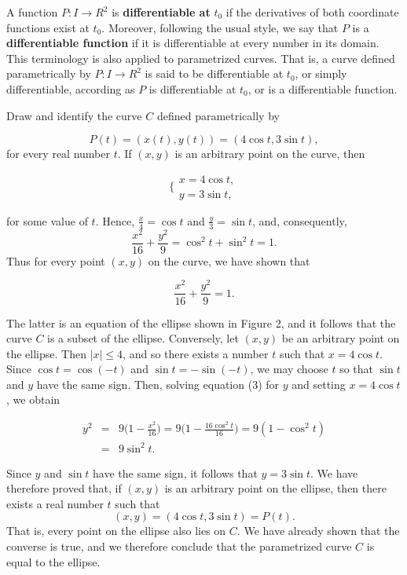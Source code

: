 A function $P : I \rightarrow R^2$ is \textbf{differentiable at} $t_0$ if the derivatives of both coordinate functions exist at $t_0$. Moreover, following the usual style, we say that $P$ is a \textbf{differentiable function} if it is differentiable at every number in its domain. This terminology is also applied to parametrized curves. That is, a curve defined parametrically by $P : I \rightarrow R^2$ is said to be differentiable at $t_0$, or simply differentiable, according as $P$ is differentiable at $t_0$, or is a differentiable function.
\begin{example} Draw and identify the curve $C$ defined parametrically by

$$
P(t) = (x(t), y(t)) = (4\cos t, 3\sin t), 
$$
\noindent for every real number $t$. If $(x, y)$ is an arbitrary point on the curve, then 
 
$$
 \{ \begin{array}{l}
x = 4 \cos t, \\
y = 3 \sin t,
\end{array}
$$

\noindent for some value of $t$. Hence, $\frac{x}{4} = \cos t$ and $\frac{y}{3} = \sin t$, and, consequently, 
$$
\frac{x^2}{16} + \frac{y^2}{9} = \cos^2 t + \sin^2 t = 1 .
$$
\noindent Thus for every point $(x, y)$ on the curve, we have shown that 

\begin{equation}
\frac{x^2}{16} + \frac{y^2}{9} = 1.  
\label{eq10.1.3}
\end{equation}


\noindent The latter is an equation of the ellipse shown in Figure 2, and it follows that the curve $C$ is a subset of the ellipse. Conversely, let $(x, y)$ be an arbitrary point on the ellipse. Then $|x| \leq 4$, and so there exists a number $t$ such that
$x = 4 \cos t$. Since $\cos t = \cos(-t)$ and $\sin t = -\sin(-t)$, we may choose $t$ so that $\sin t$ and $y$ have the same sign. Then, solving equation (3) for $y$ and setting $x = 4 \cos t$, we obtain



\begin{eqnarray*}
y^2 &=& 9 \Big(1 - \frac{x^2}{16} \Big) = 9 \Big(1 - \frac{16 \cos^2 t}{16} \Big) = 9(1 - \cos^2 t) \\
      &=& 9 \sin^2t.
\end{eqnarray*}

\noindent Since $y$ and $\sin t$ have the same sign, it follows that $y = 3 \sin t$. We have therefore proved that, if $(x, y)$ is an arbitrary point on the ellipse, then there exists a real number $t$ such that
$$
(x, y) = (4 \cos t, 3 \sin t) = P(t).
$$
\noindent That is, every point on the ellipse also lies on $C$. We have already shown that the converse is true, and we therefore conclude that the parametrized curve $C$ is equal to the ellipse.
\end{example}

